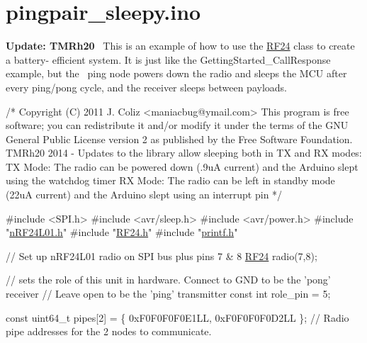 \hypertarget{pingpair_sleepy_8ino-example}{}\section{pingpair\+\_\+sleepy.\+ino}
{\bfseries Update\+: T\+M\+Rh20}~\newline
 This is an example of how to use the \hyperlink{classRF24}{R\+F24} class to create a battery-\/ efficient system. It is just like the Getting\+Started\+\_\+\+Call\+Response example, but the~\newline
 ping node powers down the radio and sleeps the M\+CU after every ping/pong cycle, and the receiver sleeps between payloads. ~\newline



\begin{DoxyCodeInclude}
\textcolor{comment}{/*}
\textcolor{comment}{ Copyright (C) 2011 J. Coliz <maniacbug@ymail.com>}
\textcolor{comment}{}
\textcolor{comment}{ This program is free software; you can redistribute it and/or}
\textcolor{comment}{ modify it under the terms of the GNU General Public License}
\textcolor{comment}{ version 2 as published by the Free Software Foundation.}
\textcolor{comment}{ }
\textcolor{comment}{ TMRh20 2014 - Updates to the library allow sleeping both in TX and RX modes:}
\textcolor{comment}{      TX Mode: The radio can be powered down (.9uA current) and the Arduino slept using the watchdog timer}
\textcolor{comment}{      RX Mode: The radio can be left in standby mode (22uA current) and the Arduino slept using an
       interrupt pin}
\textcolor{comment}{ */}

\textcolor{preprocessor}{#include <SPI.h>}
\textcolor{preprocessor}{#include <avr/sleep.h>}
\textcolor{preprocessor}{#include <avr/power.h>}
\textcolor{preprocessor}{#include "\hyperlink{nRF24L01_8h}{nRF24L01.h}"}
\textcolor{preprocessor}{#include "\hyperlink{RF24_8h}{RF24.h}"}
\textcolor{preprocessor}{#include "\hyperlink{printf_8h}{printf.h}"}


\textcolor{comment}{// Set up nRF24L01 radio on SPI bus plus pins 7 & 8}
\hyperlink{classRF24}{RF24} radio(7,8);

\textcolor{comment}{// sets the role of this unit in hardware.  Connect to GND to be the 'pong' receiver}
\textcolor{comment}{// Leave open to be the 'ping' transmitter}
\textcolor{keyword}{const} \textcolor{keywordtype}{int} role\_pin = 5;

\textcolor{keyword}{const} uint64\_t pipes[2] = \{ 0xF0F0F0F0E1LL, 0xF0F0F0F0D2LL \};   \textcolor{comment}{// Radio pipe addresses for the 2 nodes to
       communicate.}


\end{DoxyCodeInclude}

